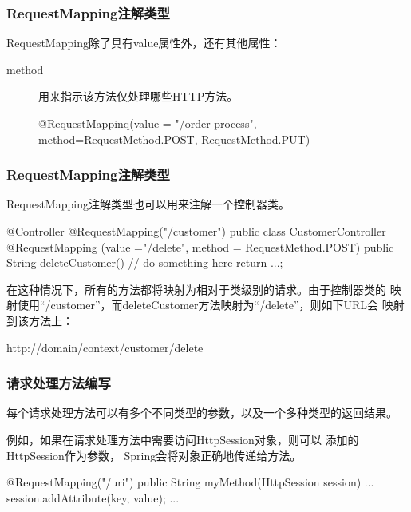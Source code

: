 \documentclass[hyperref={pdfpagelabels=false},compress,table]{beamer} %
\newcommand{\kai}{\CJKfamily{KaiTi}}
\def\Blue{\color{blue}}
\begin{document}
\begin{frame}[fragile]
  \frametitle{RequestMapping注解类型}

  RequestMapping除了具有value属性外，还有其他属性：
  \begin{description}
  \item[method] 用来指示该方法仅处理哪些HTTP方法。
    \begin{javaCode}
      @RequestMappinq(value = "/order-process",
      method={RequestMethod.POST, RequestMethod.PUT})
    \end{javaCode}
  \end{description}

\end{frame}


\begin{frame}[fragile]
  \frametitle{RequestMapping注解类型}

  RequestMapping注解类型也可以用来注解一个控制器类。
  \begin{javaCode}
  @Controller
  @RequestMapping("/customer")
  public class CustomerController {
    @RequestMapping (value ="/delete", method = RequestMethod.POST)
    public String deleteCustomer() {
      // do something here
      return ...;
    }
  }
  \end{javaCode}

  在这种情况下，所有的方法都将映射为相对于类级别的请求。由于控制器类的
  映射使用“/customer”，而deleteCustomer方法映射为“/delete”，则如下URL会
  映射到该方法上：
  
  \begin{shCode}
    http://domain/context/customer/delete
  \end{shCode}
  
\end{frame}

\begin{frame}[fragile]
  \frametitle{请求处理方法编写}

  每个请求处理方法可以有多个不同类型的参数，以及一个多种类型的返回结果。

  {\kai\Blue 例如，如果在请求处理方法中需要访问HttpSession对象，则可以
    添加的HttpSession作为参数， Spring会将对象正确地传递给方法。}

  \begin{javaCode}
  @RequestMapping("/uri")
  public String myMethod(HttpSession session) {
    ...
    session.addAttribute(key, value);
    ...
  }
  \end{javaCode}

\end{frame}
\end{document}
